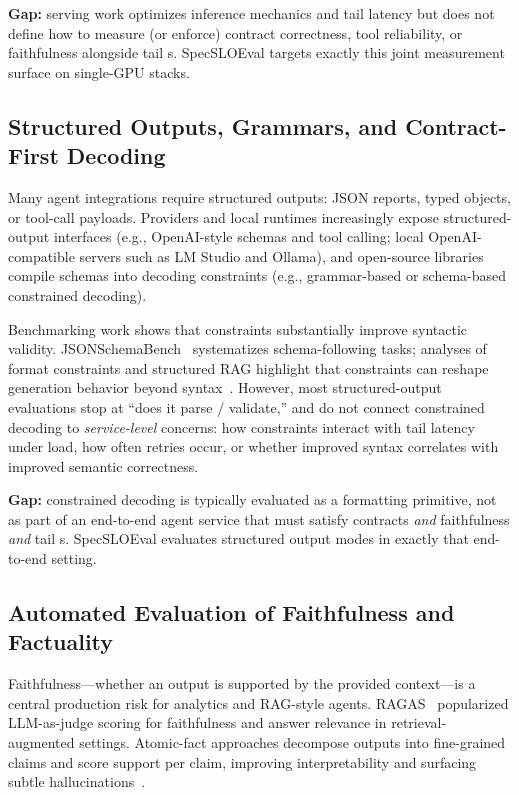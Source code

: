 \textbf{Gap:} serving work optimizes inference mechanics and tail latency but does not define how to measure (or enforce) contract correctness, tool reliability, or faithfulness alongside tail \slo s.
SpecSLOEval targets exactly this joint measurement surface on single-GPU stacks.

\subsection{Structured Outputs, Grammars, and Contract-First Decoding}

Many agent integrations require structured outputs: JSON reports, typed objects, or tool-call payloads.
Providers and local runtimes increasingly expose structured-output interfaces (e.g., OpenAI-style schemas and tool calling; local OpenAI-compatible servers such as LM Studio and Ollama), and open-source libraries compile schemas into decoding constraints (e.g., grammar-based or schema-based constrained decoding).

Benchmarking work shows that constraints substantially improve syntactic validity.
JSONSchemaBench~\citep{geng2025jsonschemabench} systematizes schema-following tasks; analyses of format constraints and structured RAG highlight that constraints can reshape generation behavior beyond syntax~\citep{letmespeakfreely,structuredRAG}.
However, most structured-output evaluations stop at “does it parse / validate,” and do not connect constrained decoding to \emph{service-level} concerns: how constraints interact with tail latency under load, how often retries occur, or whether improved syntax correlates with improved semantic correctness.

\textbf{Gap:} constrained decoding is typically evaluated as a formatting primitive, not as part of an end-to-end agent service that must satisfy contracts \emph{and} faithfulness \emph{and} tail \slo s.
SpecSLOEval evaluates structured output modes in exactly that end-to-end setting.

\subsection{Automated Evaluation of Faithfulness and Factuality}

Faithfulness---whether an output is supported by the provided context---is a central production risk for analytics and RAG-style agents.
RAGAS~\citep{es2023ragas} popularized LLM-as-judge scoring for faithfulness and answer relevance in retrieval-augmented settings.
Atomic-fact approaches decompose outputs into fine-grained claims and score support per claim, improving interpretability and surfacing subtle hallucinations~\citep{atomicFacts2024}.

